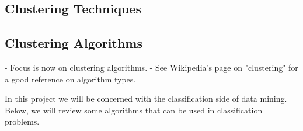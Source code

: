 \subsection{Clustering Techniques}\label{sec:clustertech}

\subsection{Clustering Algorithms}\label{sec:clusteralgo}

\begin{Notes}
- Focus is now on clustering algorithms.
- See Wikipedia's page on "clustering" for a good reference on algorithm types.\\
\end{Notes}

In this project we will be concerned with the classification side of data
mining. Below, we will review some algorithms that can be used in
classification problems.






